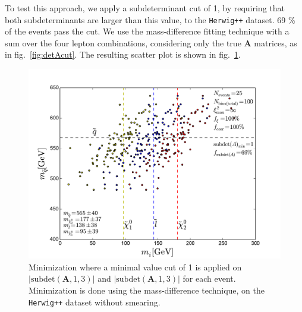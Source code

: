 \documentclass[twoside,english]{uiofysmaster}
\begin{document}
To test this approach, we apply a subdeterminant cut of 1, by requiring that both subdeterminants are larger than this value, to the {\tt Herwig++} dataset. 69 \% of the events pass the cut. We use the mass-difference fitting technique with a sum over the four lepton combinations, considering only the true $\mathbf A$ matrices, as in fig.\ \ref{fig:detAcut}. The resulting scatter plot is shown in fig.\ \ref{fig:subdetAcut}.
\begin{figure}[hbt]
	\centering
		\includegraphics[width=\textwidth]{figures/improving_combinatorics/4combosum_herwigpp-nosmear-noxisqcut-subdetAcut1.pdf} 
		\caption{ }

	\caption{Minimization where a minimal value cut of 1 is applied on $|\mathrm{subdet}(\mathbf A,1,3)|$ and $|\mathrm{subdet}(\mathbf A,1,3)|$ for each event. Minimization is done using the mass-difference technique, on the {\tt Herwig++} dataset without smearing.%
	}
	\label{fig:subdetAcut}
\end{figure}
\end{document}
